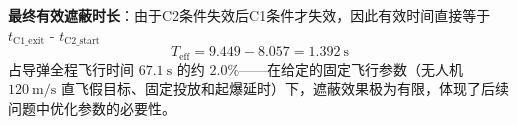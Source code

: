 \documentclass[12pt,a4paper]{ctexart}
\newcommand{\Teff}{T_{\text{eff}}}
\begin{document}
\textbf{最终有效遮蔽时长}：由于C2条件失效后C1条件才失效，因此有效时间直接等于$t_{\text{C1\_exit}}$ - $t_{\text{C2\_start}}$
\begin{equation}
\boxed{\Teff = 9.449-8.057 = 1.392\ \mathrm{s}}
\end{equation}
	占导弹全程飞行时间 $67.1\ \mathrm{s}$ 的约 $2.0\%$——在给定的固定飞行参数（无人机 $120\ \mathrm{m/s}$ 直飞假目标、固定投放和起爆延时）下，遮蔽效果极为有限，体现了后续问题中优化参数的必要性。
\end{document}
